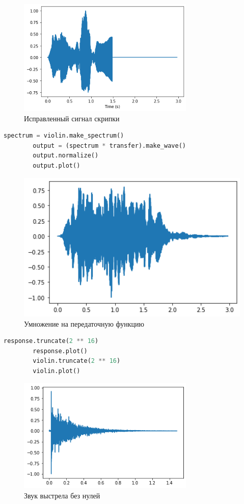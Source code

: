 \documentclass[a4paper, 12pt]{report}
\begin{document}
	\begin{figure}[H]
		\centering
		\includegraphics[width=0.75\textwidth]{task3.png}
		\caption{Исправленный сигнал скрипки}
		\label{fig:task3}
	\end{figure}
	\begin{lstlisting}[language=Python,caption=Перемножаем спектры]
		spectrum = violin.make_spectrum()
		output = (spectrum * transfer).make_wave()
		output.normalize()
		output.plot()
	\end{lstlisting}
	\begin{figure}[H]
		\centering
		\includegraphics[width=1.0\textwidth]{task4.png}
		\caption{Умножение на передаточную функцию}
		\label{fig:task4}
	\end{figure}
	\begin{lstlisting}[language=Python,caption=Убираем нули в конце сигналов]
		response.truncate(2 ** 16)
		response.plot()
		violin.truncate(2 ** 16)
		violin.plot()
	\end{lstlisting}
	\begin{figure}[H]
		\centering
		\includegraphics[width=0.75\textwidth]{task5.png}
		\caption{Звук выстрела без нулей}
		\label{fig:task5}
	\end{figure}
\end{document}
